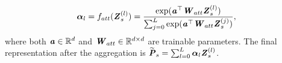 \documentclass[letterpaper]{article} %
\begin{document}
\begin{align}
    \boldsymbol{\alpha}_l = f_{att}(\textbf{\textit{Z}}_{s}^{(l)}) = \frac{\exp(\textbf{\textit{a}}^{\top}\textbf{\textit{W}}_{att} \textbf{\textit{Z}}^{(l)}_{s})}{\sum_{j=0}^{L}\exp(\textbf{\textit{a}}^{\top}\textbf{\textit{W}}_{att}\textbf{\textit{Z}}^{(j)}_s)},
\end{align}
where both $\textbf{\textit{a}}\in \mathbb{R}^{d}$ and $\textbf{\textit{W}}_{att}\in \mathbb{R}^{d\times d}$ are trainable parameters. The final representation after the aggregation is $\widetilde{\textbf{\textit{P}}}_s=\sum_{l=0}^{L}{\boldsymbol{\alpha}_l\textbf{\textit{Z}}^{(l)}_s}$.
\end{document}
